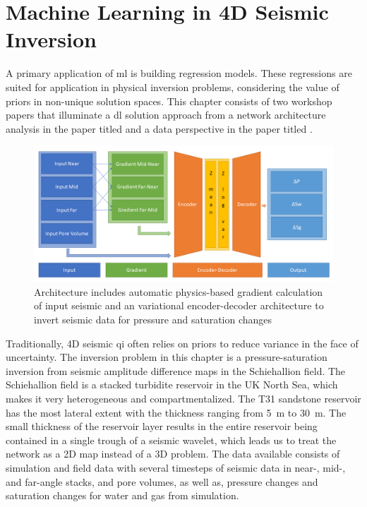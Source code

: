 \section{Machine Learning in 4D Seismic Inversion}

A primary application of \acl{ml} is building regression models. These regressions are suited for application in physical inversion problems, considering the value of priors in non-unique solution spaces. This chapter consists of two workshop papers that illuminate a \ac{dl} solution approach from a network architecture analysis in the paper titled  \citep{dramsch2019including} and a data perspective in the paper titled  \citep{dramsch2019deep}.

\begin{figure}
    \centering
    \includegraphics[width=\textwidth]{figures/AVO-Net.png}
    \caption{Architecture includes automatic physics-based gradient calculation of input seismic and an variational encoder-decoder architecture to invert seismic data for pressure and saturation changes \citep[from][]{dramsch2019including}}
    \label{fig:avo-net}
\end{figure}

Traditionally, 4D seismic \acf{qi} often relies on priors to reduce variance in the face of uncertainty. The inversion problem in this chapter is a pressure-saturation inversion from seismic amplitude difference maps in the Schiehallion field. The Schiehallion field is a stacked turbidite reservoir in the UK North Sea, which makes it very heterogeneous and compartmentalized. The T31 sandstone reservoir has the most lateral extent with the thickness ranging from 5~m to 30~m. The small thickness of the reservoir layer results in the entire reservoir being contained in a single trough of a seismic wavelet, which leads us to treat the network as a 2D map instead of a 3D problem. The data available consists of simulation and field data with several timesteps of seismic data in near-, mid-, and far-angle stacks, and pore volumes, as well as, pressure changes and saturation changes for water and gas from simulation.

